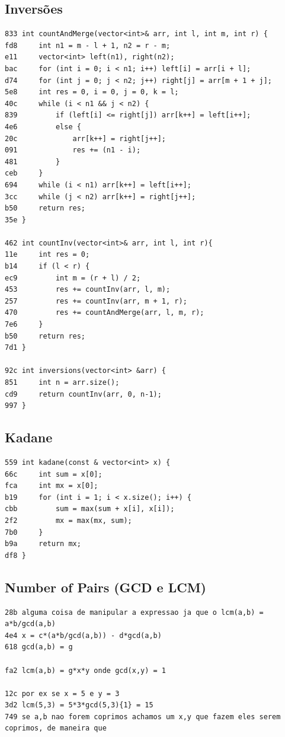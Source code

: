 \documentclass[11pt, a4paper, twoside]{article}
\begin{document}
{{\subsection{Inversões}
\begin{lstlisting}
833 int countAndMerge(vector<int>& arr, int l, int m, int r) {
fd8     int n1 = m - l + 1, n2 = r - m;
e11     vector<int> left(n1), right(n2);
bac     for (int i = 0; i < n1; i++) left[i] = arr[i + l];
d74     for (int j = 0; j < n2; j++) right[j] = arr[m + 1 + j];
5e8     int res = 0, i = 0, j = 0, k = l;
40c     while (i < n1 && j < n2) {
839         if (left[i] <= right[j]) arr[k++] = left[i++];
4e6         else {
20c             arr[k++] = right[j++];
091             res += (n1 - i);
481         }
ceb     }
694     while (i < n1) arr[k++] = left[i++];
3cc     while (j < n2) arr[k++] = right[j++];
b50     return res;
35e }

462 int countInv(vector<int>& arr, int l, int r){
11e     int res = 0;
b14     if (l < r) {
ec9         int m = (r + l) / 2;
453         res += countInv(arr, l, m);
257         res += countInv(arr, m + 1, r);
470         res += countAndMerge(arr, l, m, r);
7e6     }
b50     return res;
7d1 }

92c int inversions(vector<int> &arr) {
851   	int n = arr.size();
cd9   	return countInv(arr, 0, n-1);
997 }
\end{lstlisting}

\subsection{Kadane}
\begin{lstlisting}
559 int kadane(const & vector<int> x) {
66c 	int sum = x[0];
fca 	int mx = x[0];
b19 	for (int i = 1; i < x.size(); i++) {
cbb 		sum = max(sum + x[i], x[i]);
2f2 		mx = max(mx, sum);
7b0 	}
b9a 	return mx;
df8 }

\end{lstlisting}

\subsection{Number of Pairs (GCD e LCM)}
\begin{lstlisting}
28b alguma coisa de manipular a expressao ja que o lcm(a,b) = a*b/gcd(a,b)
4e4 x = c*(a*b/gcd(a,b)) - d*gcd(a,b)
618 gcd(a,b) = g
 
fa2 lcm(a,b) = g*x*y onde gcd(x,y) = 1
 
12c por ex se x = 5 e y = 3
3d2 lcm(5,3) = 5*3*gcd(5,3){1} = 15
749 se a,b nao forem coprimos achamos um x,y que fazem eles serem coprimos, de maneira que
 

\end{lstlisting}}}
\end{document}
